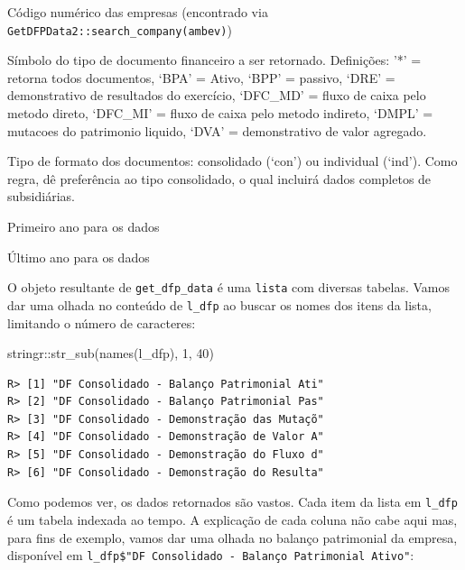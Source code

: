 \documentclass[
  11pt,
]{book}
\newenvironment{Shaded}{\begin{snugshade}}{\end{snugshade}}
\newcommand{\DecValTok}[1]{\textcolor[rgb]{0.06,0.06,0.06}{#1}}
\newcommand{\FunctionTok}[1]{\textcolor[rgb]{0,0,0}{#1}}
\newcommand{\NormalTok}[1]{#1}
\newcommand{\SpecialCharTok}[1]{\textcolor[rgb]{0,0,0}{#1}}
\providecommand{\tightlist}{%
  \setlength{\itemsep}{0pt}\setlength{\parskip}{0pt}}
\begin{document}
\begin{description}
\tightlist
\item[companies\_cvm\_codes]
Código numérico das empresas (encontrado via \texttt{GetDFPData2::search\_company(\textquotesingle{}ambev\textquotesingle{})})
\item[type\_docs]
Símbolo do tipo de documento financeiro a ser retornado. Definições: '*' = retorna todos documentos, `BPA' = Ativo, `BPP' = passivo, `DRE' = demonstrativo de resultados do exercício, `DFC\_MD' = fluxo de caixa pelo metodo direto, `DFC\_MI' = fluxo de caixa pelo metodo indireto, `DMPL' = mutacoes do patrimonio liquido, `DVA' = demonstrativo de valor agregado.
\item[type\_format]
Tipo de formato dos documentos: consolidado (`con') ou individual (`ind'). Como regra, dê preferência ao tipo consolidado, o qual incluirá dados completos de subsidiárias.
\item[first\_year]
Primeiro ano para os dados
\item[last\_year]
Último ano para os dados
\end{description}

O objeto resultante de \texttt{get\_dfp\_data} é uma \texttt{lista} com diversas tabelas. Vamos dar uma olhada no conteúdo de \texttt{l\_dfp} ao buscar os nomes dos itens da lista, limitando o número de caracteres:

\begin{Shaded}
\begin{Highlighting}[]
\NormalTok{stringr}\SpecialCharTok{::}\FunctionTok{str\_sub}\NormalTok{(}\FunctionTok{names}\NormalTok{(l\_dfp), }\DecValTok{1}\NormalTok{, }\DecValTok{40}\NormalTok{)}
\end{Highlighting}
\end{Shaded}

\begin{verbatim}
R> [1] "DF Consolidado - Balanço Patrimonial Ati"
R> [2] "DF Consolidado - Balanço Patrimonial Pas"
R> [3] "DF Consolidado - Demonstração das Mutaçõ"
R> [4] "DF Consolidado - Demonstração de Valor A"
R> [5] "DF Consolidado - Demonstração do Fluxo d"
R> [6] "DF Consolidado - Demonstração do Resulta"
\end{verbatim}

Como podemos ver, os dados retornados são vastos. Cada item da lista em \texttt{l\_dfp} é um tabela indexada ao tempo. A explicação de cada coluna não cabe aqui mas, para fins de exemplo, vamos dar uma olhada no balanço patrimonial da empresa, disponível em \texttt{l\_dfp\$"DF\ Consolidado\ -\ Balanço\ Patrimonial\ Ativo"}:
\end{document}
